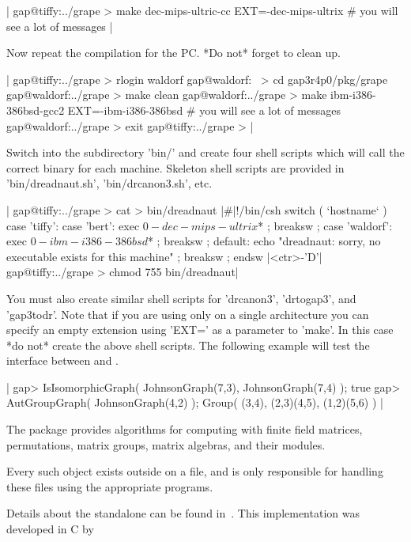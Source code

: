 |    gap@tiffy:../grape > make dec-mips-ultric-cc EXT=-dec-mips-ultrix
    # you will see a lot of messages |

Now repeat the compilation for the PC. *Do not* forget to clean up.

|    gap@tiffy:../grape > rlogin waldorf
    gap@waldorf:~ > cd gap3r4p0/pkg/grape
    gap@waldorf:../grape > make clean
    gap@waldorf:../grape > make ibm-i386-386bsd-gcc2 EXT=-ibm-i386-386bsd
    # you will see a lot of messages
    gap@waldorf:../grape > exit
    gap@tiffy:../grape > |

Switch into  the subdirectory 'bin/'  and create four shell scripts which
will call the correct binary for each machine. Skeleton shell scripts are
provided in 'bin/dreadnaut.sh', 'bin/drcanon3.sh', etc.

|    gap@tiffy:../grape > cat > bin/dreadnaut
    |\#|!/bin/csh
    switch ( `hostname` )
      case 'tiffy':
      case 'bert':
        exec $0-dec-mips-ultrix $* ;
        breaksw ;
      case 'waldorf':
        exec $0-ibm-i386-386bsd $* ;
        breaksw ;
      default:
        echo "dreadnaut: sorry, no executable exists for this machine" ;
        breaksw ;
    endsw
    |<ctr>-'D'|
    gap@tiffy:../grape > chmod 755 bin/dreadnaut|

You  must also create similar  shell scripts for  'drcanon3', 'drtogap3',
and 'gap3todr'.  Note  that if you  are using  {\GRAPE} only on a  single
architecture you  can  specify  an empty  extension  using  'EXT='  as  a
parameter  to 'make'.   In  this  case  *do not*  create the  above shell
scripts.  The  following example will test the interface between {\GRAPE}
and {\nauty}.

|    gap> IsIsomorphicGraph( JohnsonGraph(7,3), JohnsonGraph(7,4) );
    true
    gap> AutGroupGraph( JohnsonGraph(4,2) );
    Group( (3,4), (2,3)(4,5), (1,2)(5,6) ) |


The {\MeatAxe} package provides algorithms for computing with finite field
matrices, permutations, matrix groups, matrix algebras, and their modules.

Every such object exists outside {\GAP} on a file, and {\GAP} is only
responsible for handling these files using the appropriate programs.

Details about the standalone can be found in~\cite{Rin93}.
This implementation was developed in C by

